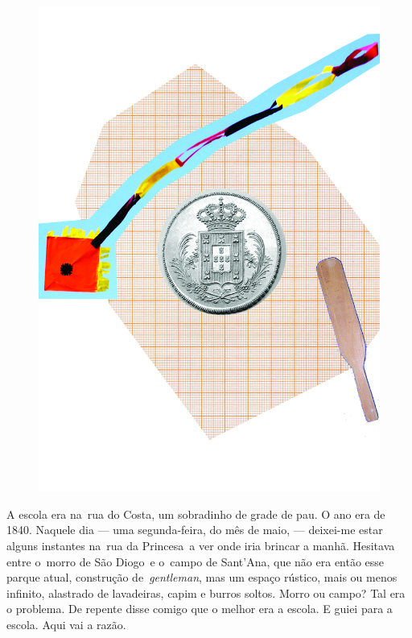 \pagebreak
\thispagestyle{empty}
\begin{figure}
\vspace*{-.5cm}
\hspace*{-2.3cm}\includegraphics[width=140mm]{../ilustracoes/02_ESCOLA.jpg}
\end{figure}
\pagebreak


\noindent{}A escola era na~rua do Costa, um sobradinho de grade de pau. O ano era
de 1840. Naquele dia --- uma segunda-feira, do mês de maio, ---
deixei-me estar alguns instantes na~rua da Princesa~a ver onde iria
brincar a manhã. Hesitava entre o~morro de São Diogo~e o~campo de
Sant'Ana, que não era então esse parque atual, construção
de~\emph{gentleman}, mas um espaço rústico, mais ou menos infinito,
alastrado de lavadeiras, capim e burros soltos. Morro ou campo? Tal era
o problema. De repente disse comigo que o melhor era a escola. E guiei
para a escola. Aqui vai a razão.

